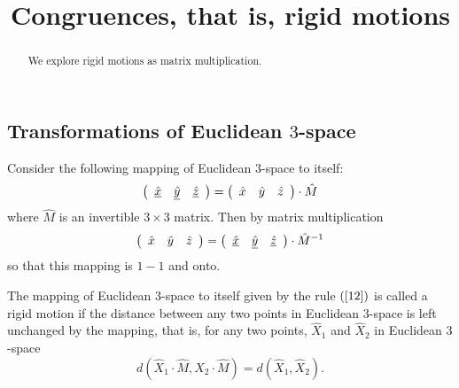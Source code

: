 \documentclass{ximera}
\title{Congruences, that is, rigid motions}
\begin{document}
\begin{abstract}
We explore rigid motions as matrix multiplication.
\end{abstract}
\maketitle

\subsection*{Transformations of Euclidean $3$-space}

Consider the following mapping of Euclidean $3$-space to itself:%
\begin{equation}
\left(
\begin{array}
[c]{ccc}%
\underline{\hat{x}} & \underline{\hat{y}} & \underline{\hat{z}}%
\end{array}
\right)  =\left(
\begin{array}
[c]{ccc}%
\hat{x} & \hat{y} & \hat{z}%
\end{array}
\right)  \cdot\hat{M} \label{12}%
\end{equation}
where $\hat{M}$ is an invertible $3\times3$ matrix. Then by matrix
multiplication%
\[
\left(
\begin{array}
[c]{ccc}%
\hat{x} & \hat{y} & \hat{z}%
\end{array}
\right)  =\left(
\begin{array}
[c]{ccc}%
\underline{\hat{x}} & \underline{\hat{y}} & \underline{\hat{z}}%
\end{array}
\right)  \cdot\hat{M}^{-1}%
\]
so that this mapping is $1-1$ and onto.

\begin{definition}
The mapping of Euclidean $3$-space to itself given by the rule $\left(
\ref{12}\right)  $ is called a rigid motion if the distance between any two
points in Euclidean $3$-space is left unchanged by the mapping, that is, for
any two points, $\hat{X}_{1}$ and $\hat{X}_{2}$ in Euclidean $3$-space%
\[
d\left( \hat{X}_{1}  \cdot\hat{M},\hat{X}_{2}
\cdot\hat{M}\right)  =d\left(  \hat{X}_{1},\hat{X}_{2}\right)  .
\]

\end{definition}
\end{document}
